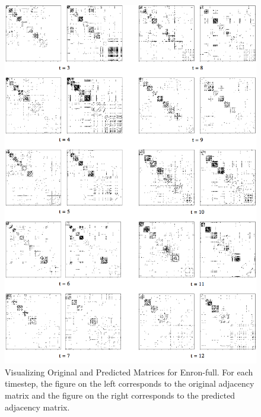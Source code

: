 \documentclass[letterpaper]{article} %
\begin{document}
\begin{figure}
\vskip 0.2in
\begin{center}
\centering
\includegraphics[scale=0.60]{enron_link_prediction}
\caption{Visualizing Original and Predicted Matrices for Enron-full. For each timestep, the figure on the left corresponds to the original adjacency matrix and the figure on the right corresponds to the predicted adjacency matrix.}
\label{fig:enron_link_pred}
\end{center}
\vskip -0.2in
\end{figure}
\end{document}
